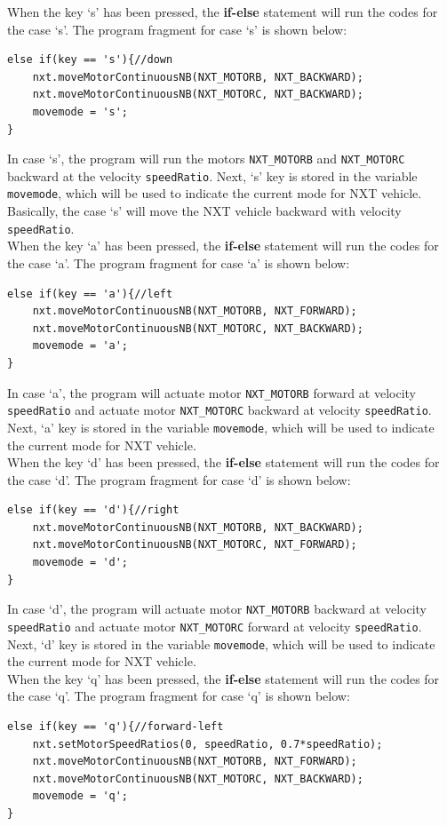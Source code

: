 \documentclass[11pt]{article}
\begin{document}
When the key `s' has been pressed, the {\bf if-else} statement will run 
the codes for the case `s'. The program fragment for case `s' is shown below:
\begin{lstlisting}
else if(key == 's'){//down
    nxt.moveMotorContinuousNB(NXT_MOTORB, NXT_BACKWARD);
    nxt.moveMotorContinuousNB(NXT_MOTORC, NXT_BACKWARD);
    movemode = 's';
}
\end{lstlisting}
In case `s', the program will run the motors {\tt NXT\_MOTORB} and 
{\tt NXT\_MOTORC} backward at the velocity {\tt speedRatio}. Next, `s' key is 
stored in the variable {\tt movemode}, which will be used to indicate the 
current mode for NXT vehicle. Basically, the case `s' will move the NXT vehicle 
backward with velocity {\tt speedRatio}.\\ 
When the key `a' has been pressed, the {\bf if-else} statement will run 
the codes for the case `a'. The program fragment for case `a' is shown below:
\begin{lstlisting}
else if(key == 'a'){//left
    nxt.moveMotorContinuousNB(NXT_MOTORB, NXT_FORWARD);
    nxt.moveMotorContinuousNB(NXT_MOTORC, NXT_BACKWARD);
    movemode = 'a';
}
\end{lstlisting}
In case `a', the program will actuate motor {\tt NXT\_MOTORB} forward at velocity 
{\tt speedRatio} and actuate motor {\tt NXT\_MOTORC} backward at velocity 
{\tt speedRatio}. Next, `a' key is stored in the variable {\tt movemode}, which 
will be used to indicate the current mode for NXT vehicle.\\ 
When the key `d' has been pressed, the {\bf if-else} statement will run 
the codes for the case `d'. The program fragment for case `d' is shown below:
\begin{lstlisting}
else if(key == 'd'){//right
    nxt.moveMotorContinuousNB(NXT_MOTORB, NXT_BACKWARD);
    nxt.moveMotorContinuousNB(NXT_MOTORC, NXT_FORWARD);
    movemode = 'd';
}
\end{lstlisting}
In case `d', the program will actuate motor {\tt NXT\_MOTORB} backward at 
velocity {\tt speedRatio} and actuate motor {\tt NXT\_MOTORC} forward at velocity 
{\tt speedRatio}. Next, `d' key is stored in the variable {\tt movemode}, which 
will be used to indicate the current mode for NXT vehicle.\\ 
When the key `q' has been pressed, the {\bf if-else} statement will run 
the codes for the case `q'. The program fragment for case `q' is shown below:
\begin{lstlisting}
else if(key == 'q'){//forward-left
    nxt.setMotorSpeedRatios(0, speedRatio, 0.7*speedRatio);
    nxt.moveMotorContinuousNB(NXT_MOTORB, NXT_FORWARD);
    nxt.moveMotorContinuousNB(NXT_MOTORC, NXT_BACKWARD);
    movemode = 'q';
}
\end{lstlisting}
\end{document}
